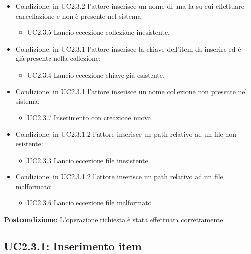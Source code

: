 \documentclass{scalatekids-article}
\begin{document}
\begin{itemize}
\item Condizione: in UC2.3.2 l'attore inserisce un nome di una la  su cui effettuare cancellazione e non è presente nel sistema:
  \begin{itemize}
  \item UC2.3.5 Lancio eccezione collezione inesistente.
  \end{itemize}
\item Condizione: in UC2.3.1 l'attore inserisce la chiave dell'item da inserire ed è già presente nella collezione:
  \begin{itemize}
  \item UC2.3.4 Lancio eccezione chiave già esistente.
  \end{itemize}
\item Condizione: in UC2.3.1 l'attore inserisce un nome collezione non presente nel sistema:
  \begin{itemize}
  \item UC2.3.7 Inserimento con creazione nuova .
  \end{itemize}
\item Condizione: in UC2.3.1.2 l'attore inserisce un path relativo ad un file non esistente:
  \begin{itemize}
  \item UC2.3.3 Lancio eccezione file inesistente.
  \end{itemize}
\item Condizione: in UC2.3.1.2 l'attore inserisce un path relativo ad un file malformato: %
  \begin{itemize}
  \item UC2.3.6 Lancio eccezione file malformato
  \end{itemize}
\end{itemize}
\textbf{Postcondizione:} L'operazione richiesta è stata effettuata correttamente.

\subsection{UC2.3.1: Inserimento item}
\end{document}
